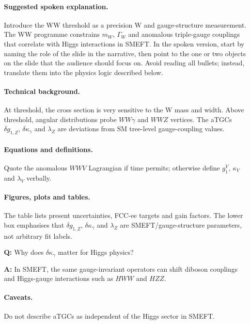 \documentclass[11pt,a4paper]{report}
\begin{document}
\paragraph{Suggested spoken explanation.}
Introduce the WW threshold as a precision W and gauge-structure measurement. The WW programme constrains $m_W$, $\Gamma_W$ and anomalous triple-gauge couplings that correlate with Higgs interactions in SMEFT. In the spoken version, start by naming the role of the slide in the narrative, then point to the one or two objects on the slide that the audience should focus on.  Avoid reading all bullets; instead, translate them into the physics logic described below.

\paragraph{Technical background.}
At threshold, the cross section is very sensitive to the W mass and width.  Above threshold, angular distributions probe $WW\gamma$ and $WWZ$ vertices.  The aTGCs $\delta g_{1,Z}$, $\delta\kappa_\gamma$ and $\lambda_Z$ are deviations from SM tree-level gauge-coupling values.

\paragraph{Equations and definitions.}
Quote the anomalous $WWV$ Lagrangian if time permits; otherwise define $g_1^V$, $\kappa_V$ and $\lambda_V$ verbally.

\paragraph{Figures, plots and tables.}
The table lists present uncertainties, FCC-ee targets and gain factors.  The lower box emphasises that $\delta g_{1,Z}$, $\delta\kappa_\gamma$ and $\lambda_Z$ are SMEFT/gauge-structure parameters, not arbitrary fit labels.

\begin{questionbox}
\textbf{Q:} Why does $\delta\kappa_\gamma$ matter for Higgs physics?\par
\textbf{A:} In SMEFT, the same gauge-invariant operators can shift diboson couplings and Higgs-gauge interactions such as $HWW$ and $HZZ$.
\end{questionbox}

\paragraph{Caveats.}
Do not describe aTGCs as independent of the Higgs sector in SMEFT.
\end{document}
